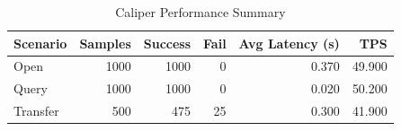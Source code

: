 \begin{table}
\caption{Caliper Performance Summary}
\label{tab:caliper_round}
\begin{tabular}{lrrrrr}
\toprule
Scenario & Samples & Success & Fail & Avg Latency (s) & TPS \\
\midrule
Open & 1000 & 1000 & 0 & 0.370 & 49.900 \\
Query & 1000 & 1000 & 0 & 0.020 & 50.200 \\
Transfer & 500 & 475 & 25 & 0.300 & 41.900 \\
\bottomrule
\end{tabular}
\end{table}
